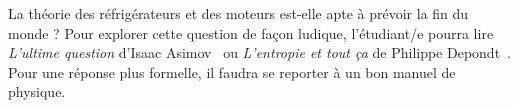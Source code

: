 		La théorie des réfrigérateurs et des moteurs est-elle apte à prévoir la fin du monde ? Pour explorer cette question de façon ludique, l’étudiant/e pourra lire \textit{L’ultime question} d’Isaac \mbox{Asimov}~\cite{asimov1956,asimov1956fr} ou \textit{L’entropie et tout ça} de Philippe \mbox{Depondt}~\cite{depondt2001}. Pour une réponse plus formelle, il faudra se reporter à un bon manuel de physique.
